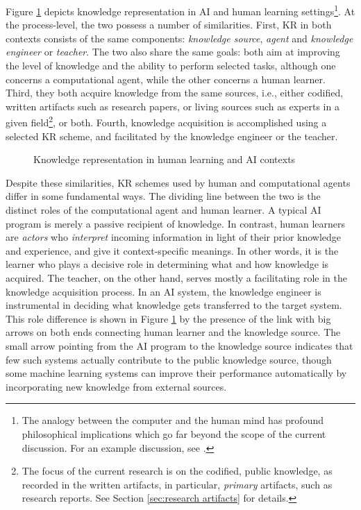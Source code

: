 Figure \ref{fig:kr} depicts knowledge representation in AI and human
learning settings\footnote{The analogy between the computer and the human mind
has profound philosophical implications which go far beyond the scope of
the current discussion. For an example discussion, see \cite{Harnad89}.}.
At the process-level, the two possess a number of similarities. First, KR
in both contexts consists of the same components: {\it knowledge source\/},
{\it agent\/} and {\it knowledge engineer\/} or {\it teacher\/}.  The two
also share the same goals: both aim at improving the level of knowledge and
the ability to perform selected tasks, although one concerns a
computational agent, while the other concerns a human learner. Third, they
both acquire knowledge from the same sources, i.e., either codified,
written artifacts such as research papers, or living sources such as
experts in a given field\footnote{The focus of the current research is on the
codified, public knowledge, as recorded in the written artifacts, in
particular, {\it primary\/} artifacts, such as research reports. See
Section \ref{sec:research artifacts} for details.}, or both.  Fourth,
knowledge acquisition is accomplished using a selected KR scheme, and
facilitated by the knowledge engineer or the teacher.

\begin{figure}[htb]
  \caption{Knowledge representation in human learning and AI contexts}
  \label{fig:kr}
\end{figure}

Despite these similarities, KR schemes used by human and computational
agents differ in some fundamental ways. The dividing line between the two
is the distinct roles of the computational agent and human learner.  A
typical AI program is merely a passive recipient of knowledge.  In
contrast, human learners are {\it actors\/} who {\it interpret \/} incoming
information in light of their prior knowledge and experience, and give it
context-specific meanings. In other words, it is the learner who plays a
decisive role in determining what and how knowledge is acquired.  The
teacher, on the other hand, serves mostly a facilitating role in the
knowledge acquisition process. In an AI system, the knowledge engineer is
instrumental in deciding what knowledge gets transferred to the target
system. This role difference is shown in Figure \ref{fig:kr} by the
presence of the link with big arrows on both ends connecting human learner
and the knowledge source.  The small arrow pointing from the AI program to
the knowledge source indicates that few such systems actually contribute to
the public knowledge source, though some machine learning systems can
improve their performance automatically by incorporating new knowledge from
external sources.

